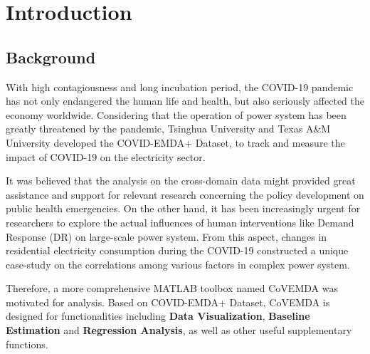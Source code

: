 \documentclass[10pt]{article}
\numberwithin{equation}{section}
\numberwithin{table}{section}
\numberwithin{figure}{section}
\begin{document}
\newpage
\section{Introduction} \label{sec:intro}

\subsection{Background}

With high contagiousness and long incubation period\cite{who2021}, the COVID-19 pandemic has not only endangered the human life and health, but also seriously affected the economy worldwide. Considering that the operation of power system has been greatly threatened by the pandemic\cite{gillingham2020short}\cite{zhong2020implications}\cite{elavarasan2020covid}, Tsinghua University and Texas A\&M University developed the COVID-EMDA+ Dataset, to track and measure the impact of COVID-19 on the electricity sector.

It was believed that the analysis on the cross-domain data might provided great assistance and support for relevant research concerning the policy development on public health emergencies. On the other hand, it has been increasingly urgent for researchers to explore the actual influences of human interventions like Demand Response (DR) on large-scale power system. From this aspect, changes in residential electricity consumption during the COVID-19 constructed a unique case-study on the correlations among various factors in complex power system\cite{ruan2020cross}\cite{ruan2021quantitative}.

Therefore, a more comprehensive MATLAB toolbox named CoVEMDA was motivated for analysis. Based on COVID-EMDA+ Dataset, CoVEMDA is designed for functionalities including \textbf{Data Visualization}, \textbf{Baseline Estimation} and \textbf{Regression Analysis}, as well as other useful supplementary functions.
\end{document}
